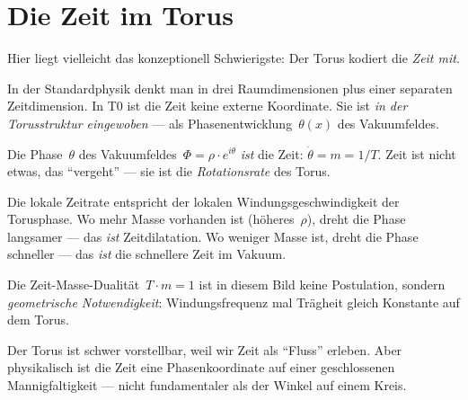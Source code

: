 \section{Die Zeit im Torus}

Hier liegt vielleicht das konzeptionell Schwierigste: Der Torus kodiert die \emph{Zeit mit}.

In der Standardphysik denkt man in drei Raumdimensionen plus einer separaten Zeitdimension. In T0 ist die Zeit keine externe Koordinate. Sie ist \emph{in der Torusstruktur eingewoben} --- als Phasenentwicklung~$\theta(x)$ des Vakuumfeldes.

Die Phase~$\theta$ des Vakuumfeldes~$\Phi = \rho \cdot e^{i\theta}$ \emph{ist} die Zeit: $\dot{\theta} = m = 1/T$. Zeit ist nicht etwas, das \enquote{vergeht} --- sie ist die \emph{Rotationsrate} des Torus.

Die lokale Zeitrate entspricht der lokalen Windungsgeschwindigkeit der Torusphase. Wo mehr Masse vorhanden ist (höheres~$\rho$), dreht die Phase langsamer --- das \emph{ist} Zeitdilatation. Wo weniger Masse ist, dreht die Phase schneller --- das \emph{ist} die schnellere Zeit im Vakuum.

Die Zeit-Masse-Dualität~$T \cdot m = 1$ ist in diesem Bild keine Postulation, sondern \emph{geometrische Notwendigkeit}: Windungsfrequenz mal Trägheit gleich Konstante auf dem Torus.

\begin{kerngedanke}
Der Torus ist schwer vorstellbar, weil wir Zeit als \enquote{Fluss} erleben. Aber physikalisch ist die Zeit eine Phasenkoordinate auf einer geschlossenen Mannigfaltigkeit --- nicht fundamentaler als der Winkel auf einem Kreis.
\end{kerngedanke}
